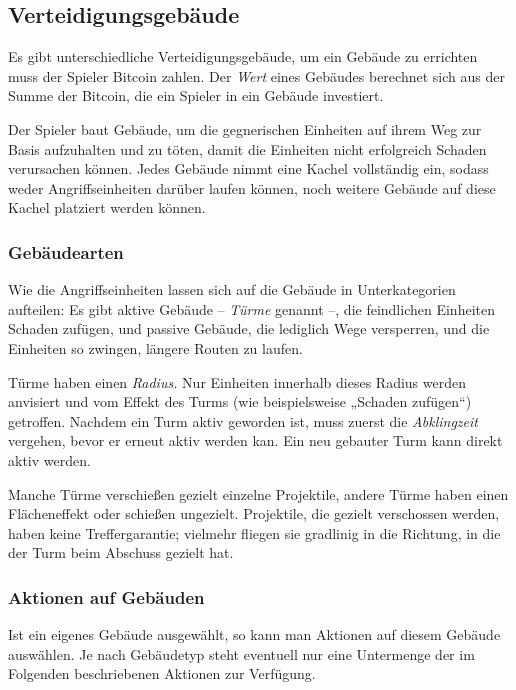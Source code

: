 \subsection{Verteidigungsgebäude}

Es gibt unterschiedliche Verteidigungsgebäude, um ein Gebäude zu errichten muss
der Spieler Bitcoin zahlen. Der \emph{Wert} eines Gebäudes berechnet sich aus
der Summe der Bitcoin, die ein Spieler in ein Gebäude investiert.

Der Spieler baut Gebäude, um die gegnerischen Einheiten auf ihrem Weg zur Basis
aufzuhalten und zu töten, damit die Einheiten nicht erfolgreich Schaden
verursachen können. Jedes Gebäude nimmt eine Kachel vollständig ein, sodass
weder Angriffseinheiten darüber laufen können, noch weitere Gebäude auf diese
Kachel platziert werden können.


\subsubsection{Gebäudearten}

Wie die Angriffseinheiten lassen sich auf die Gebäude in Unterkategorien
aufteilen: Es gibt aktive Gebäude -- \emph{Türme} genannt --, die feindlichen
Einheiten Schaden zufügen, und passive Gebäude, die lediglich Wege versperren,
und die Einheiten so zwingen, längere Routen zu laufen.  

Türme haben einen \emph{Radius.} Nur Einheiten innerhalb dieses Radius werden
anvisiert und vom Effekt des Turms (wie beispielsweise „Schaden zufügen“)
getroffen. Nachdem ein Turm aktiv geworden ist, muss zuerst die
\emph{Abklingzeit} vergehen, bevor er erneut aktiv werden kan. Ein neu gebauter
Turm kann direkt aktiv werden.

Manche Türme verschießen gezielt einzelne Projektile, andere Türme haben einen
Flächeneffekt oder schießen ungezielt. Projektile, die gezielt verschossen
werden, haben keine Treffergarantie; vielmehr fliegen sie gradlinig in die
Richtung, in die der Turm beim Abschuss gezielt hat.


\subsubsection{Aktionen auf Gebäuden}

Ist ein eigenes Gebäude ausgewählt, so kann man Aktionen auf diesem Gebäude
auswählen. Je nach Gebäudetyp steht eventuell nur eine Untermenge der im
Folgenden beschriebenen Aktionen zur Verfügung.

